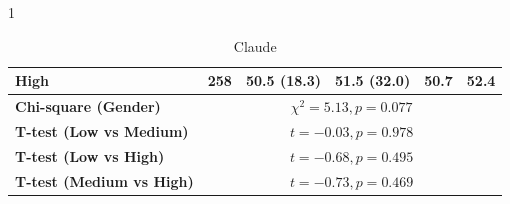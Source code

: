 \documentclass[preprint,12pt,authoryear]{elsarticle}
\begin{document}
\begin{table}[t!]
\begin{subtable}{1\textwidth}
{\begin{tabular}{lccccc}
High   & 258 & 50.5 (18.3) & 51.5 (32.0) & 50.7 & 52.4 \\
\midrule
\textbf{Chi-square (Gender)} & \multicolumn{5}{c}{$\chi^2 = 5.13, p = 0.077$} \\
\textbf{T-test (Low vs Medium)} & \multicolumn{5}{c}{$t = -0.03, p = 0.978$} \\
\textbf{T-test (Low vs High)}   & \multicolumn{5}{c}{$t = -0.68, p = 0.495$} \\
\textbf{T-test (Medium vs High)} & \multicolumn{5}{c}{$t = -0.73, p = 0.469$} \\
\bottomrule
\end{tabular}
}
\caption{Claude}
\label{tab:scoring_stats_claude}
\end{subtable}

\vspace{0.5em}


\end{table}
\end{document}
